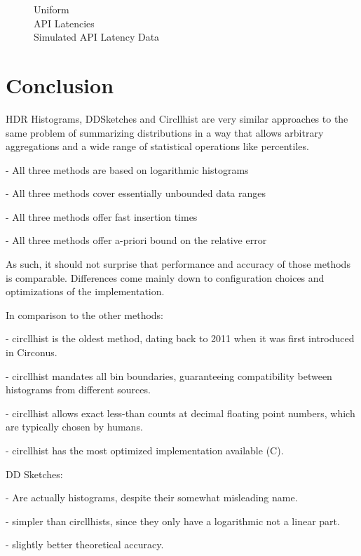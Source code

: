 \documentclass{article}
\theoremstyle{plain}
\theoremstyle{remark}
\begin{document}
\begin{figure}
  Uniform\\
  
  API Latencies\\
  
  Simulated API Latency Data\\
  
\end{figure}

\section{Conclusion}

HDR Histograms, DDSketches and Circllhist are very similar approaches to the same problem of
summarizing distributions in a way that allows arbitrary aggregations and a wide range of
statistical operations like percentiles.

- All three methods are based on logarithmic histograms

- All three methods cover essentially unbounded data ranges

- All three methods offer fast insertion times

- All three methods offer a-priori bound on the relative error

As such, it should not surprise that performance and accuracy of those methods is comparable.
Differences come mainly down to configuration choices and optimizations of the implementation.

In comparison to the other methods:

- circllhist is the oldest method, dating back to 2011 when it was first introduced in Circonus.

- circllhist mandates all bin boundaries, guaranteeing compatibility between histograms from different sources.

- circllhist allows exact less-than counts at decimal floating point numbers, which are typically chosen by humans.

- circllhist has the most optimized implementation available (C).

DD Sketches:

- Are actually histograms, despite their somewhat misleading name.

- simpler than circllhists, since they only have a logarithmic not a linear part.

- slightly better theoretical accuracy.
\end{document}
